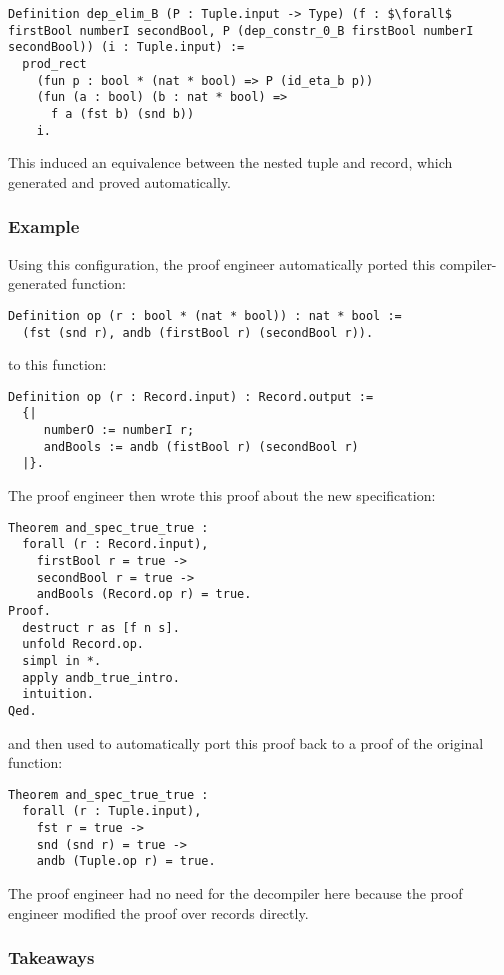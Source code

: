 \begin{lstlisting}
Definition dep_elim_B (P : Tuple.input -> Type) (f : $\forall$ firstBool numberI secondBool, P (dep_constr_0_B firstBool numberI secondBool)) (i : Tuple.input) :=
  prod_rect
    (fun p : bool * (nat * bool) => P (id_eta_b p))
    (fun (a : bool) (b : nat * bool) =>
      f a (fst b) (snd b))
    i.
\end{lstlisting}
This induced an equivalence between the nested tuple and record,
which \toolname generated and proved automatically.

\subsubsection{Example}
Using this configuration, the proof engineer automatically ported this compiler-generated function:

\begin{lstlisting}
Definition op (r : bool * (nat * bool)) : nat * bool :=
  (fst (snd r), andb (firstBool r) (secondBool r)).
\end{lstlisting}
to this function:

\begin{lstlisting}
Definition op (r : Record.input) : Record.output :=
  {|
     numberO := numberI r;
     andBools := andb (fistBool r) (secondBool r)
  |}.
\end{lstlisting}
The proof engineer then wrote this proof about the new specification: %

\begin{lstlisting}
Theorem and_spec_true_true :
  forall (r : Record.input),
    firstBool r = true ->
    secondBool r = true ->
    andBools (Record.op r) = true.
Proof.
  destruct r as [f n s].
  unfold Record.op.
  simpl in *.
  apply andb_true_intro.
  intuition.
Qed.
\end{lstlisting}
and then used \toolname to automatically port this proof back to a proof of the original function: %

\begin{lstlisting}
Theorem and_spec_true_true :
  forall (r : Tuple.input),
    fst r = true ->
    snd (snd r) = true ->
    andb (Tuple.op r) = true.
\end{lstlisting}
The proof engineer had no need for the decompiler here because the proof engineer modified
the proof over records directly. %

\subsubsection{Takeaways}

